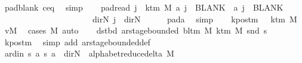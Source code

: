 \begin{isabellebody}
\ pad{\isacharunderscore}{\kern0pt}blank\ c{\isacharprime}{\kern0pt}{\isacharunderscore}{\kern0pt}eq\ \isamarkupfalse%
\ simp\isanewline
\ \ \isamarkupfalse%
\ pad{\isacharunderscore}{\kern0pt}read{\isacharcolon}{\kern0pt}\ {\isachardoublequoteopen}{\isasymforall}j\ {\isasymge}\ k{\isacharunderscore}{\kern0pt}tm\ M{\isachardot}{\kern0pt}\ {\isacharquery}{\kern0pt}a\ j\ {\isacharequal}{\kern0pt}\ BLANK{}\ {\isasymand}\ {\isacharquery}{\kern0pt}a\ j\ {\isacharequal}{\kern0pt}\ BLANK{}\isanewline
\ \ \ \ \ \ \ \ \ \ \ \ \ \ \ \ \ \ \ \ {\isasymand}\ {\isacharparenleft}{\kern0pt}{\isasymlambda}{\isacharunderscore}{\kern0pt}{\isachardot}{\kern0pt}\ dir{\isachardot}{\kern0pt}N{\isacharparenright}{\kern0pt}\ j\ {\isacharequal}{\kern0pt}\ dir{\isachardot}{\kern0pt}N{\isachardoublequoteclose}\isanewline
\ \ \ \ \isamarkupfalse%
\ pad{\isacharunderscore}{\kern0pt}a\ \isamarkupfalse%
\ simp\isanewline
\ \ \isamarkupfalse%
\ kpos{\isacharunderscore}{\kern0pt}tm{\isacharcolon}{\kern0pt}\ {\isachardoublequoteopen}{}\ {\isacharless}{\kern0pt}\ k{\isacharunderscore}{\kern0pt}tm\ M{\isachardoublequoteclose}\ \isamarkupfalse%
\ vM\ \isamarkupfalse%
\ {\isacharparenleft}{\kern0pt}cases\ M{\isacharparenright}{\kern0pt}\ auto\isanewline
\ \ \isamarkupfalse%
\ dst{\isacharunderscore}{\kern0pt}bd{\isacharcolon}{\kern0pt}\ {\isachardoublequoteopen}ar{\isacharunderscore}{\kern0pt}stage{\isacharunderscore}{\kern0pt}bounded\ {\isacharparenleft}{\kern0pt}bl{\isacharunderscore}{\kern0pt}tm\ M{\isacharparenright}{\kern0pt}\ {\isacharparenleft}{\kern0pt}k{\isacharunderscore}{\kern0pt}tm\ M{\isacharparenright}{\kern0pt}\ {\isacharparenleft}{\kern0pt}snd\ {\isacharquery}{\kern0pt}s{\isacharprime}{\kern0pt}{\isacharparenright}{\kern0pt}{\isachardoublequoteclose}\isanewline
\ \ \ \ \isamarkupfalse%
\ kpos{\isacharunderscore}{\kern0pt}tm\ \isamarkupfalse%
\ {\isacharparenleft}{\kern0pt}simp\ add{\isacharcolon}{\kern0pt}\ ar{\isacharunderscore}{\kern0pt}stage{\isacharunderscore}{\kern0pt}bounded{\isacharunderscore}{\kern0pt}def{\isacharparenright}{\kern0pt}\isanewline
\ \ \isamarkupfalse%
\ ard{\isacharunderscore}{\kern0pt}in{\isacharcolon}{\kern0pt}\ {\isachardoublequoteopen}{\isacharparenleft}{\kern0pt}{\isacharquery}{\kern0pt}s{\isacharcomma}{\kern0pt}\ {\isacharquery}{\kern0pt}a{\isacharcomma}{\kern0pt}\ {\isacharquery}{\kern0pt}s{\isacharprime}{\kern0pt}{\isacharcomma}{\kern0pt}\ {\isacharquery}{\kern0pt}a{\isacharcomma}{\kern0pt}\ {\isacharparenleft}{\kern0pt}{\isasymlambda}{\isacharunderscore}{\kern0pt}{\isachardot}{\kern0pt}\ dir{\isachardot}{\kern0pt}N{\isacharparenright}{\kern0pt}{\isacharparenright}{\kern0pt}\ {\isasymin}\ alphabet{\isacharunderscore}{\kern0pt}reduce{\isacharunderscore}{\kern0pt}delta\ M{\isachardoublequoteclose}\isanewline

\end{isabellebody}
